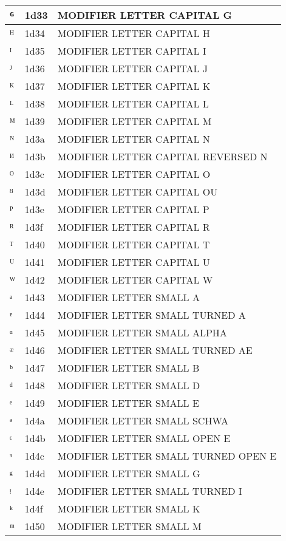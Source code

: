 \documentclass[12pt,letterpaper,openany]{book}
\begin{document}
\begin{center}
\begin{supertabular}{|m{0.25in}|m{0.5in}|m{4in}|}
			ᴳ & 1d33 & MODIFIER LETTER CAPITAL G\\\hline
			ᴴ & 1d34 & MODIFIER LETTER CAPITAL H\\\hline
			ᴵ & 1d35 & MODIFIER LETTER CAPITAL I\\\hline
			ᴶ & 1d36 & MODIFIER LETTER CAPITAL J\\\hline
			ᴷ & 1d37 & MODIFIER LETTER CAPITAL K\\\hline
			ᴸ & 1d38 & MODIFIER LETTER CAPITAL L\\\hline
			ᴹ & 1d39 & MODIFIER LETTER CAPITAL M\\\hline
			ᴺ & 1d3a & MODIFIER LETTER CAPITAL N\\\hline
			ᴻ & 1d3b & MODIFIER LETTER CAPITAL REVERSED N\\\hline
			ᴼ & 1d3c & MODIFIER LETTER CAPITAL O\\\hline
			ᴽ & 1d3d & MODIFIER LETTER CAPITAL OU\\\hline
			ᴾ & 1d3e & MODIFIER LETTER CAPITAL P\\\hline
			ᴿ & 1d3f & MODIFIER LETTER CAPITAL R\\\hline
			ᵀ & 1d40 & MODIFIER LETTER CAPITAL T\\\hline
			ᵁ & 1d41 & MODIFIER LETTER CAPITAL U\\\hline
			ᵂ & 1d42 & MODIFIER LETTER CAPITAL W\\\hline
			ᵃ & 1d43 & MODIFIER LETTER SMALL A\\\hline
			ᵄ & 1d44 & MODIFIER LETTER SMALL TURNED A\\\hline
			ᵅ & 1d45 & MODIFIER LETTER SMALL ALPHA\\\hline
			ᵆ & 1d46 & MODIFIER LETTER SMALL TURNED AE\\\hline
			ᵇ & 1d47 & MODIFIER LETTER SMALL B\\\hline
			ᵈ & 1d48 & MODIFIER LETTER SMALL D\\\hline
			ᵉ & 1d49 & MODIFIER LETTER SMALL E\\\hline
			ᵊ & 1d4a & MODIFIER LETTER SMALL SCHWA\\\hline
			ᵋ & 1d4b & MODIFIER LETTER SMALL OPEN E\\\hline
			ᵌ & 1d4c & MODIFIER LETTER SMALL TURNED OPEN E\\\hline
			ᵍ & 1d4d & MODIFIER LETTER SMALL G\\\hline
			ᵎ & 1d4e & MODIFIER LETTER SMALL TURNED I\\\hline
			ᵏ & 1d4f & MODIFIER LETTER SMALL K\\\hline
			ᵐ & 1d50 & MODIFIER LETTER SMALL M\\\hline

\end{supertabular}
\end{center}
\end{document}

